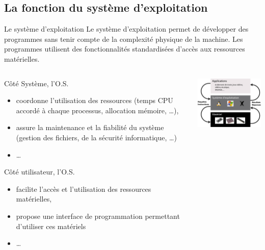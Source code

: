 \subsection{La fonction du système d'exploitation}
\begin{frame}{Le système d'exploitation}
  Le système d'exploitation permet de développer des programmes sans tenir compte de la complexité physique de la machine. Les programmes utilisent des fonctionnalités standardisées d'accès aux ressources matérielles.
  \begin{columns}
    \begin{column}{5.5cm}
      \begin{block}{Côté Système, l'O.S.}
        \begin{itemize}
        \item coordonne l'utilisation des ressources (\ex temps CPU accordé à chaque processus, allocation mémoire, \dots),
        \item assure la maintenance et la fiabilité du système (\ex gestion des fichiers, de la sécurité informatique, \dots)
        \item \dots
        \end{itemize}
      \end{block}
      \begin{block}{Côté utilisateur, l'O.S.}
        \begin{itemize}
        \item facilite l'accès et l'utilisation des ressources matérielles,
        \item propose une interface de programmation permettant d'utiliser ces matériels
        \item \dots
        \end{itemize}
      \end{block}
    \end{column}
    \begin{column}{6cm}
      \begin{center}
        \includegraphics[width=6cm]{img/s01/OS_interface_2.jpg}
      \end{center}
    \end{column}
  \end{columns}
\end{frame}
